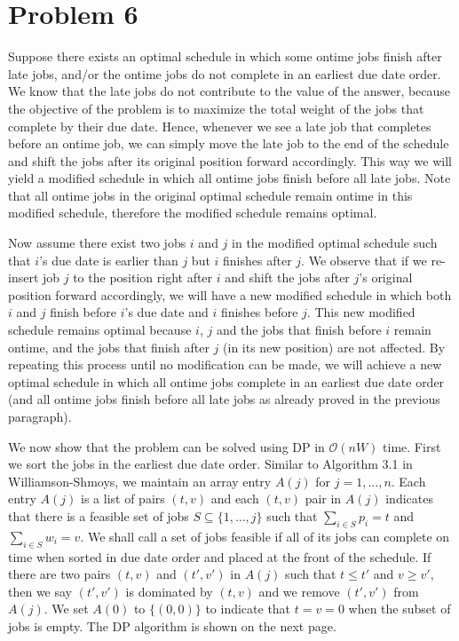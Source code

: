 \documentclass{article}
\begin{document}
\section*{Problem 6}

Suppose there exists an optimal schedule in which some ontime jobs finish after late jobs, and/or the ontime jobs do not complete in an earliest due date order. We know that the late jobs do not contribute to the value of the answer, because the objective of the problem is to maximize the total weight of the jobs that complete by their due date. Hence, whenever we see a late job that completes before an ontime job, we can simply move the late job to the end of the schedule and shift the jobs after its original position forward  accordingly. This way we will yield a modified schedule in which all ontime jobs finish before all late jobs. Note that all ontime jobs in the original optimal schedule remain ontime in this modified schedule, therefore the modified schedule remains optimal.\par
Now assume there exist two jobs $i$ and $j$ in the modified optimal schedule such that $i$'s due date is earlier than $j$ but $i$ finishes after $j$. We observe that if we re-insert job $j$ to the position right after $i$ and shift the jobs after $j$'s original position forward accordingly, we will have a new modified schedule in which both $i$ and $j$ finish before $i$'s due date and $i$ finishes before $j$. This new modified schedule remains optimal because $i$, $j$ and the jobs that finish before $i$ remain ontime, and the jobs that finish after $j$ (in its new position) are not affected. By repeating this process until no modification can be made, we will achieve a new optimal schedule in which all ontime jobs complete in an earliest due date order (and all ontime jobs finish before all late jobs as already proved in the previous paragraph).\par
We now show that the problem can be solved using DP in $\mathcal{O}(nW)$ time. First we sort the jobs in the earliest due date order. Similar to Algorithm 3.1 in Williamson-Shmoys, we maintain an array entry $A(j)$ for $j = 1, \dots, n$. Each entry $A(j)$ is a list of pairs $(t, v)$ and each $(t, v)$ pair in $A(j)$ indicates that there is a feasible set of jobs $S \subseteq \{1, \dots, j\}$ such that $\sum_{i \in S}p_i = t$ and $\sum_{i \in S} w_i = v$. We shall call a set of jobs feasible if all of its jobs can complete on time when sorted in due date order and placed at the front of the schedule. If there are two pairs $(t, v)$ and $(t', v')$ in $A(j)$ such that $t \leq t'$ and $v \geq v'$, then we say $(t', v')$ is dominated by $(t, v)$ and we remove $(t', v')$ from $A(j)$. We set $A(0)$ to $\{(0,0)\}$ to indicate that $t = v = 0$ when the subset of jobs is empty. The DP algorithm is shown on the next page.
\end{document}
